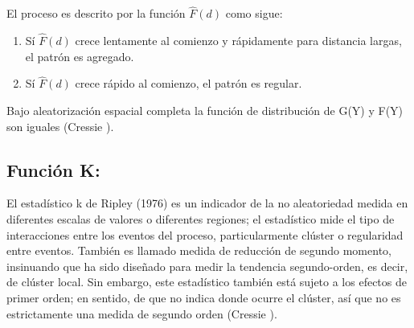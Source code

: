 \documentclass[12pt]{report}
\begin{document}
		
		
		
		El proceso es descrito por la función $\widehat{F}(d)$   como sigue: 
		
		\begin{enumerate}
			
			\item   
			Sí $\widehat{F}(d)$ crece lentamente al comienzo y rápidamente para distancia largas, el patrón es agregado.
			
			\item   
			Sí $\widehat{F}(d)$  crece rápido al comienzo, el patrón es regular.
			
		\end{enumerate}
		
		
		
		Bajo aleatorización espacial completa  la función de distribución de G(Y) y F(Y) son iguales (Cressie \cite{Cress}).
		
		
		
		
		
		
		
		
		
		
		
		\subsection*{Función K:} El estadístico k de Ripley (1976) es un indicador de la no aleatoriedad medida en diferentes escalas de valores o diferentes regiones; el estadístico mide el tipo de interacciones entre los eventos del proceso, particularmente clúster o regularidad entre eventos. También es llamado medida de reducción de segundo momento, insinuando que ha sido diseñado para medir la tendencia segundo-orden, es decir, de clúster local. Sin embargo, este estadístico también está sujeto a los efectos de primer orden; en sentido, de que no indica donde ocurre el clúster, así que no es estrictamente una medida de segundo orden (Cressie \cite{Cress}).\\
		
		
\end{document}
